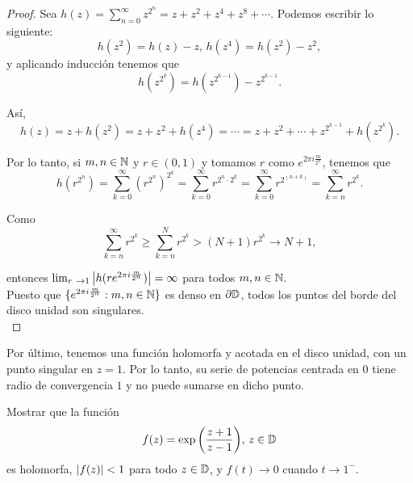 \begin{proof}
     Sea $h(z) = \sum_{n=0}^{\infty} z^{2^n} = z + z^2 + z^4 + z^8 + \cdots$. Podemos escribir lo siguiente:
    \begin{equation*}
         h(z^2) = h(z) - z, \,
         h(z^4) = h(z^2) - z^2,
    \end{equation*}
    y aplicando inducción tenemos que
    \begin{equation*}
        h(z^{2^k}) = h(z^{2^{k-1}}) - z^{2^{k-1}}.
    \end{equation*}

    Así,
    \begin{equation*}
        h(z) = z + h(z^2) = z + z^2 + h(z^4) = \cdots = z + z^2 + \cdots + z^{2^{k-1}} + h(z^{2^k}).
    \end{equation*}

    Por lo tanto, si $m, n \in \mathbb{N}$ y $r \in (0,1)$ y tomamos $r$ como $e^{2 \pi i \frac{m}{2^n}}$, tenemos que
    \begin{equation*}
        h(r^{2^n}) = \sum_{k=0}^{\infty} (r^{2^n})^{2^k} = \sum_{k=0}^{\infty} r^{2^n \cdot 2^k} = \sum_{k=0}^{\infty} r^{2^{(n+k)}} =  \sum_{k=n}^{\infty} r^{2^k}.
    \end{equation*}

    Como
    \begin{equation*}
        \sum_{k=n}^{\infty} r^{2^k} \geq \sum_{k=n}^{N} r^{2^k} > (N + 1) r^{2^k} \to N + 1,
    \end{equation*}

    entonces $\lim_{r \to 1} \abs{h(re^{2 \pi i \frac{m}{2^n}})} = \infty$ para todos $m, n \in \mathbb{N}$. \\

    Puesto que $\{e^{2 \pi i \frac{m}{2^n}} : m, n \in \mathbb{N}\}$ es denso en $\partial \mathbb{D}$, todos los puntos del borde del disco unidad son singulares. \\
\end{proof}


Por último, tenemos una función holomorfa y acotada en el disco unidad, con un punto singular en $z = 1$. Por lo tanto, su serie de potencias centrada en $0$ tiene radio de convergencia $1$ y no puede sumarse en dicho punto. \\

\begin{example}
    \label{ex:exp}
    Mostrar que la función
    \begin{equation*}
        f(z) = \exp{\left(\frac{z + 1}{z - 1}\right)}, \, z \in \mathbb{D}
    \end{equation*}
    es holomorfa, $\left\lvert f(z)\right\rvert < 1$ para todo $z \in \mathbb{D}$, y $f(t) \to 0$ cuando $t \to 1^-$. %
\end{example}

